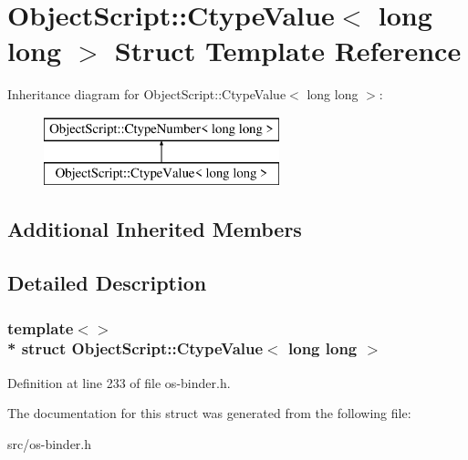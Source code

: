 \hypertarget{struct_object_script_1_1_ctype_value_3_01long_01long_01_4}{}\section{Object\+Script\+:\+:Ctype\+Value$<$ long long $>$ Struct Template Reference}
\label{struct_object_script_1_1_ctype_value_3_01long_01long_01_4}
Inheritance diagram for Object\+Script\+:\+:Ctype\+Value$<$ long long $>$\+:\begin{figure}[H]
\begin{center}
\leavevmode
\includegraphics[height=2.000000cm]{struct_object_script_1_1_ctype_value_3_01long_01long_01_4}
\end{center}
\end{figure}
\subsection*{Additional Inherited Members}


\subsection{Detailed Description}
\subsubsection*{template$<$$>$\\*
struct Object\+Script\+::\+Ctype\+Value$<$ long long $>$}



Definition at line 233 of file os-\/binder.\+h.



The documentation for this struct was generated from the following file\+:\begin{DoxyCompactItemize}
\item 
src/os-\/binder.\+h\end{DoxyCompactItemize}
